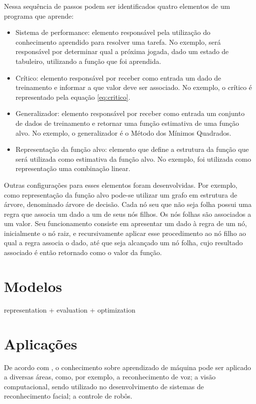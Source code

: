 Nessa sequência de passos podem ser identificados quatro elementos de um programa que aprende:

\begin{itemize}
\item Sistema de performance: elemento responsável pela utilização do conhecimento aprendido para resolver uma tarefa. No exemplo, será responsável por determinar qual a próxima jogada, dado um estado de tabuleiro, utilizando a função que foi aprendida. 
\item Crítico: elemento responsável por receber como entrada um dado de treinamento e informar a que valor deve ser associado. No exemplo, o crítico é representado pela equação \ref{eq:critico}.
\item Generalizador: elemento responsável por receber como entrada um conjunto de dados de treinamento e retornar uma função estimativa de uma função alvo. No exemplo, o generalizador é o Método dos Mínimos Quadrados.
\item Representação da função alvo: elemento que define a estrutura da função que será utilizada como estimativa da função alvo. No exemplo, foi utilizada como representação uma combinação linear.
\end{itemize}

Outras configurações para esses elementos foram desenvolvidas. Por exemplo, como representação da função alvo pode-se utilizar um grafo em estrutura de árvore, denominado árvore de decisão. Cada nó seu que não seja folha possui uma regra que associa um dado a um de seus nós filhos. Os nós folhas são associados a um valor. Seu funcionamento consiste em apresentar um dado à regra de um nó, inicialmente o nó raiz, e recursivamente aplicar esse procedimento ao nó filho ao qual a regra associa o dado, até que seja alcançado um nó folha, cujo resultado associado é então retornado como o valor da função.

\section{Modelos}
representation + evaluation + optimization \cite{ML_know}

\section{Aplicações}

De acordo com \cite{Mitchell_discipline}, o conhecimento sobre aprendizado de máquina pode ser aplicado a diversas áreas, como, por exemplo, a reconhecimento de voz; a visão computacional, sendo utilizado no desenvolvimento de sistemas de reconhecimento facial; a controle de robôs.